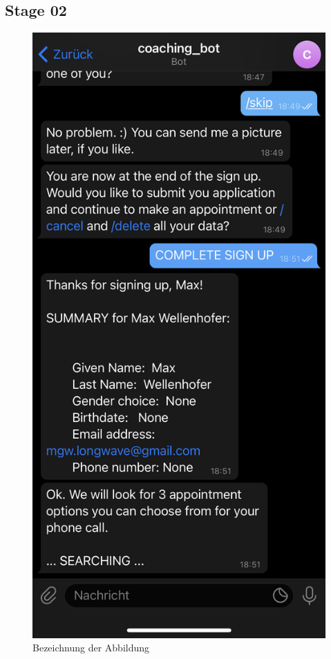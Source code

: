 \subsection{Stage 02}
\begin{figure} %
	\centering
	\includegraphics{images/coaching_bot_dummy_screenshot.jpeg}
	\caption{Bezeichnung der Abbildung}
	\label{a3}
\end{figure}


